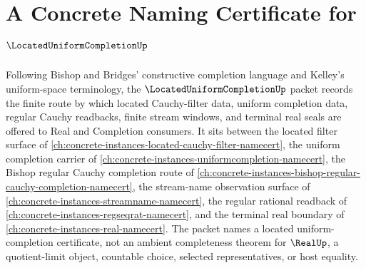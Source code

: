 \chapter{A Concrete Naming Certificate for $\LocatedUniformCompletionUp$}
\label{ch:concrete-instances-located-uniform-completion-namecert}

Following Bishop and Bridges' constructive completion language and Kelley's uniform-space terminology, the $\LocatedUniformCompletionUp$ packet records the finite route by which located Cauchy-filter data, uniform completion data, regular Cauchy readbacks, finite stream windows, and terminal real seals are offered to Real and Completion consumers. It sits between the located filter surface of \autoref{ch:concrete-instances-located-cauchy-filter-namecert}, the uniform completion carrier of \autoref{ch:concrete-instances-uniformcompletion-namecert}, the Bishop regular Cauchy completion route of \autoref{ch:concrete-instances-bishop-regular-cauchy-completion-namecert}, the stream-name observation surface of \autoref{ch:concrete-instances-streamname-namecert}, the regular rational readback of \autoref{ch:concrete-instances-regseqrat-namecert}, and the terminal real boundary of \autoref{ch:concrete-instances-real-namecert}. The packet names a located uniform-completion certificate, not an ambient completeness theorem for $\RealUp$, a quotient-limit object, countable choice, selected representatives, or host equality.

